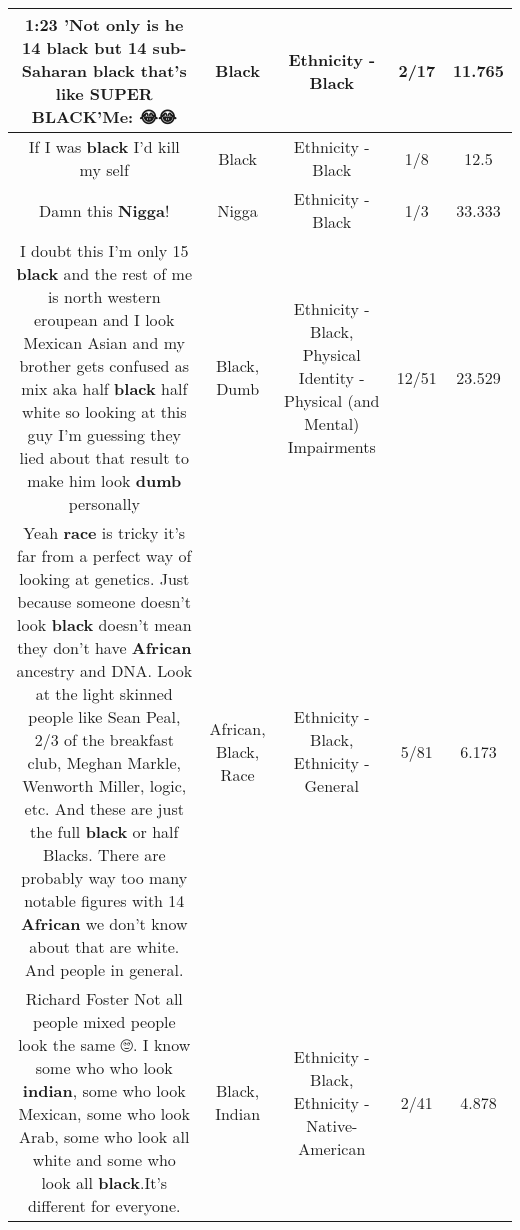 \documentclass[11pt]{article}
\newlength\mylength
\begin{document}
\begin{center}
\begin{longtable}{|C{.65\mylength}|C{.30\mylength}|C{.12\mylength}|C{.12\mylength}|C{.12\mylength}|}
  \small 1:23 'Not only is he 14 \textbf{black} but 14 sub-Saharan \textbf{black} that's like SUPER \textbf{BLACK}'Me: 😂😂\normalsize   & Black & Ethnicity - Black & 2/17 & 11.765 \\  \hline
  \small If I was \textbf{black} I'd kill my self\normalsize   & Black & Ethnicity - Black & 1/8 & 12.5 \\  \hline
  \small Damn this \textbf{Nigga}!\normalsize   & Nigga & Ethnicity - Black & 1/3 & 33.333 \\  \hline
  \small I doubt this I'm only 15 \textbf{black} and the rest of me is north western eroupean and I look Mexican Asian and my brother gets confused as mix aka half \textbf{black} half white so looking at this guy I'm guessing they lied about that result to make him look \textbf{dumb} personally\normalsize   & Black, Dumb & Ethnicity - Black, Physical Identity - Physical (and Mental) Impairments & 12/51 & 23.529 \\  \hline
  \small Yeah \textbf{race} is tricky it's far from a perfect way of looking at genetics. Just because someone doesn't look \textbf{black} doesn't mean they don't have \textbf{African} ancestry and DNA. Look at the light skinned people like Sean Peal, 2/3 of the breakfast club, Meghan Markle, Wenworth Miller, logic, etc. And these are just the full \textbf{black} or half Blacks. There are probably way too many notable figures with 14 \textbf{African} we don't know about that are white. And people in general.\normalsize   & African, Black, Race & Ethnicity - Black, Ethnicity - General & 5/81 & 6.173 \\  \hline
  \small Richard Foster Not all people mixed people look the same 🙄. I know some who who look \textbf{indian}, some who look Mexican, some who look Arab, some who look all white and some who look all \textbf{black}.It's different for everyone.\normalsize   & Black, Indian & Ethnicity - Black, Ethnicity - Native-American & 2/41 & 4.878 \\  \hline

\end{longtable}
\end{center}
\end{document}
